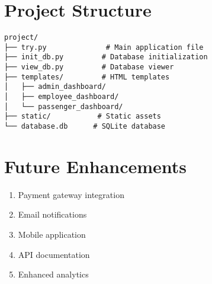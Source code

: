\documentclass{article}
\begin{document}
\section{Project Structure}
\begin{verbatim}
project/
├── try.py              # Main application file
├── init_db.py         # Database initialization
├── view_db.py         # Database viewer
├── templates/         # HTML templates
│   ├── admin_dashboard/
│   ├── employee_dashboard/
│   └── passenger_dashboard/
├── static/           # Static assets
└── database.db      # SQLite database
\end{verbatim}

\section{Future Enhancements}
\begin{enumerate}
    \item Payment gateway integration
    \item Email notifications
    \item Mobile application
    \item API documentation
    \item Enhanced analytics
\end{enumerate}
\end{document}
